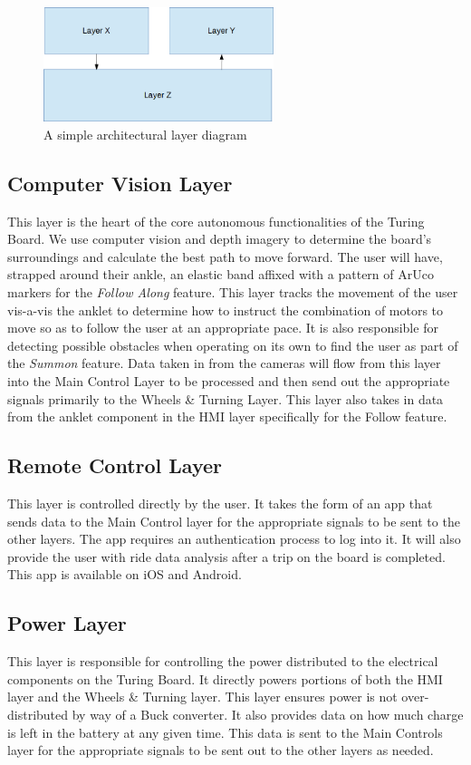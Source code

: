 \begin{figure}[h!]
	\centering
 	\includegraphics[width=0.60\textwidth]{images/layers}
 \caption{A simple architectural layer diagram}
\end{figure}

\subsection{Computer Vision Layer}
This layer is the heart of the core autonomous functionalities of the Turing Board. We use computer vision and depth imagery to determine the board's surroundings and calculate the best path to move forward. The user will have, strapped around their ankle, an elastic band affixed with a pattern of ArUco markers for the \textit{Follow Along} feature. This layer tracks the movement of the user vis-a-vis the anklet to determine how to instruct the combination of motors to move so as to follow the user at an appropriate pace. It is also responsible for detecting possible obstacles when operating on its own to find the user as part of the \textit{Summon} feature. 
Data taken in from the cameras will flow from this layer into the Main Control Layer to be processed and then send out the appropriate signals primarily to the Wheels \& Turning Layer. This layer also takes in data from the anklet component in the HMI layer specifically for the Follow feature.

\subsection{Remote Control Layer}
This layer is controlled directly by the user. It takes the form of an app that sends data to the Main Control layer for the appropriate signals to be sent to the other layers. The app requires an authentication process to log into it. It will also provide the user with ride data analysis after a trip on the board is completed. This app is available on iOS and Android.

\subsection{Power Layer}
This layer is responsible for controlling the power distributed to the electrical components on the Turing Board. It directly powers portions of both the HMI layer and the Wheels \& Turning layer. This layer ensures power is not over-distributed by way of a Buck converter. It also provides data on how much charge is left in the battery at any given time. This data is sent to the Main Controls layer for the appropriate signals to be sent out to the other layers as needed.

